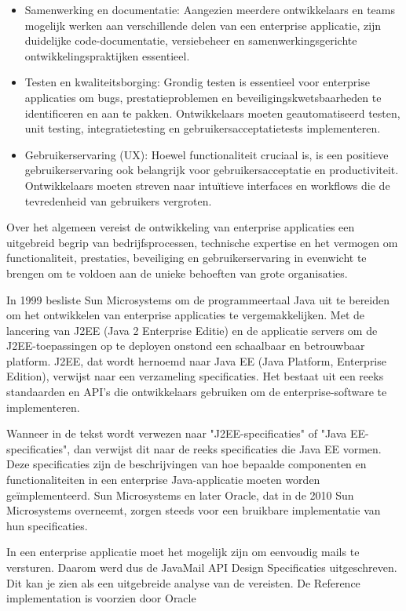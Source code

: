 \begin{itemize}
\item{Samenwerking en documentatie:} Aangezien meerdere ontwikkelaars en teams mogelijk werken aan verschillende delen van een enterprise applicatie, zijn duidelijke code-documentatie, versiebeheer en samenwerkingsgerichte ontwikkelingspraktijken essentieel.

\item{Testen en kwaliteitsborging:} Grondig testen is essentieel voor enterprise applicaties om bugs, prestatieproblemen en beveiligingskwetsbaarheden te identificeren en aan te pakken. Ontwikkelaars moeten geautomatiseerd testen, unit testing, integratietesting en gebruikersacceptatietests implementeren.

\item{Gebruikerservaring (UX):} Hoewel functionaliteit cruciaal is, is een positieve gebruikerservaring ook belangrijk voor gebruikersacceptatie en productiviteit. Ontwikkelaars moeten streven naar intuïtieve interfaces en workflows die de tevredenheid van gebruikers vergroten.
\end{itemize}

Over het algemeen vereist de ontwikkeling van enterprise applicaties een uitgebreid begrip van bedrijfsprocessen, technische expertise en het vermogen om functionaliteit, prestaties, beveiliging en gebruikerservaring in evenwicht te brengen om te voldoen aan de unieke behoeften van grote organisaties.

In 1999 besliste Sun Microsystems om de programmeertaal Java uit te bereiden om het ontwikkelen van enterprise applicaties te vergemakkelijken.  Met de lancering van J2EE (Java 2 Enterprise Editie) en de applicatie servers om de J2EE-toepassingen op te deployen onstond een schaalbaar en betrouwbaar platform. 
J2EE,  dat wordt hernoemd naar Java EE (Java Platform, Enterprise Edition), verwijst naar een verzameling specificaties. Het bestaat uit een reeks standaarden en API's die ontwikkelaars gebruiken om de enterprise-software te implementeren. 

Wanneer in de tekst wordt verwezen naar "J2EE-specificaties" of "Java EE-specificaties", dan verwijst dit naar de reeks specificaties die Java EE vormen.  Deze specificaties zijn de  beschrijvingen van hoe bepaalde componenten en functionaliteiten in een enterprise Java-applicatie moeten worden geïmplementeerd.  Sun Microsystems en later Oracle, dat in de 2010 Sun Microsystems overneemt, zorgen steeds voor een bruikbare implementatie van hun specificaties. 

In een enterprise applicatie moet het mogelijk zijn om eenvoudig mails te versturen. Daarom werd dus de JavaMail API Design Specificaties uitgeschreven. Dit kan je zien als een uitgebreide analyse van de vereisten.  De Reference implementation is voorzien door Oracle

